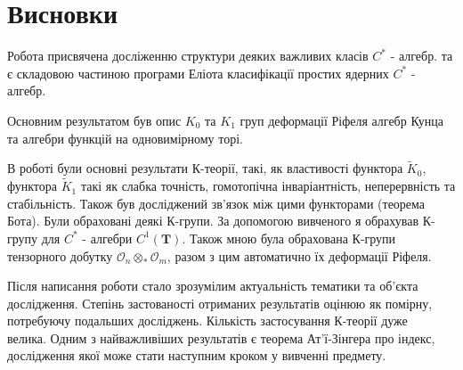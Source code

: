 \newpage
\section*{Висновки}
\label{sec:conclusion}
    Робота присвячена досліженню структури деяких важливих класів $C^*$ - алгебр.
    та є складовою частиною програми Еліота класифікації простих ядерних $C^*$ - алгебр.

    Основним результатом був опис $K_0$ та $K_1$ груп деформації Ріфеля алгебр Кунца
    та алгебри функцій на одновимірному торі.

    В роботі були основні результати К-теорії, такі,
    як властивості функтора $\widetilde{K}_0$, функтора $\widetilde{K}_1$
    такі як слабка точність, гомотопічна інваріантність, неперервність та стабільність.
    Також був досліджений зв'язок між цими функторами (теорема Бота).
    Були обраховані деякі К-групи.
    За допомогою вивченого я обрахував К-групу для $C^*$ - алгебри $C^1(\mathbf{T})$.
    Також мною була обрахована К-групи тензорного добутку $\mathcal{O}_n \otimes_* \mathcal{O}_m$,
    разом з цим автоматично їх деформації Ріфеля.

    Після написання роботи стало зрозумілим актуальність тематики та
    об'єкта дослідження.
    Степінь застованості отриманих результатів оцінюю як помірну, потребуючу
    подальших досліджень.
    Кількість застосування К-теорії дуже \\ велика.
    Одним з найважливіших результатів є теорема Ат'ї-Зінгера про індекс, \\
    дослідження якої може стати наступним кроком у вивченні предмету.

